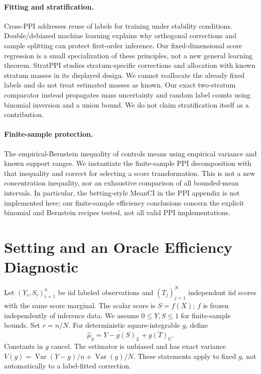 \documentclass{article}
\newcommand{\V}{\operatorname{Var}}
\begin{document}
\paragraph{Fitting and stratification.}
Cross-PPI \citep{crossppi} addresses reuse of labels for training under stability conditions. Double/debiased machine learning \citep{dml} explains why orthogonal corrections and sample splitting can protect first-order inference. Our fixed-dimensional score regression is a small specialization of these principles, not a new general learning theorem. StratPPI \citep{stratppi} studies stratum-specific corrections and allocation with known stratum masses in its displayed design. We cannot reallocate the already fixed labels and do not treat estimated masses as known. Our exact two-stratum comparator instead propagates mass uncertainty and random label counts using binomial inversion and a union bound. We do not claim stratification itself as a contribution.

\paragraph{Finite-sample protection.}
The empirical-Bernstein inequality of \citet{eb} controls means using empirical variance and known support ranges. We instantiate the finite-sample PPI decomposition with that inequality and correct for selecting a score transformation. This is not a new concentration inequality, nor an exhaustive comparison of all bounded-mean intervals. In particular, the betting-style MeanCI in the PPI appendix is not implemented here; our finite-sample efficiency conclusions concern the explicit binomial and Bernstein recipes tested, not all valid PPI implementations.

\section{Setting and an Oracle Efficiency Diagnostic}
Let $(Y_i,S_i)_{i=1}^n$ be iid labeled observations and $(T_j)_{j=1}^N$ independent iid scores with the same score marginal. The scalar score is $S=f(X)$; $f$ is frozen independently of inference data. We assume $0\leq Y,S\leq1$ for finite-sample bounds. Set $r=n/N$. For deterministic square-integrable $g$, define
\begin{equation}\label{eq:rect}
\widehat\mu_g=\overline{Y-g(S)}_L+\overline{g(T)}_U.
\end{equation}
Constants in $g$ cancel. The estimator is unbiased and has exact variance $V(g)=\V(Y-g)/n+\V(g)/N$. These statements apply to fixed $g$, not automatically to a label-fitted correction.
\end{document}
